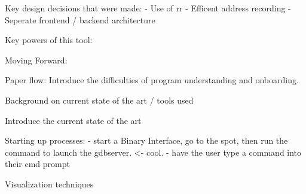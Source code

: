 \newpage %
\begin{doublespacing} %
\setcounter{page}{1} %










    

Key design decisions that were made: 
- Use of rr
- Efficent address recording
- Seperate frontend / backend architecture


Key powers of this tool:

Moving Forward:



Paper flow:
Introduce the difficulties of program understanding and onboarding.

Background on current state of the art / tools used

Introduce the current state of the art

Starting up processes:
- start a Binary Interface, go to the spot, then run the command to launch the gdbserver. <- cool.
    - have the user type a command into their cmd prompt

Visualization techniques









\end{doublespacing}
